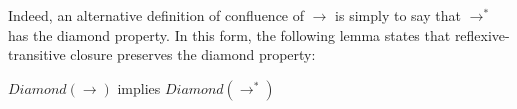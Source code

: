 \begin{center}
\end{center}

Indeed, an alternative definition of confluence of $\to$ is simply to say that $\to^*$ has the diamond property.
In this form, the following lemma states that reflexive-transitive closure preserves the diamond property:
\begin{theorem}
\label{thm:stardia}
  $\textit{Diamond}(\to)$ implies $\textit{Diamond}(\to^*)$
\end{theorem}
